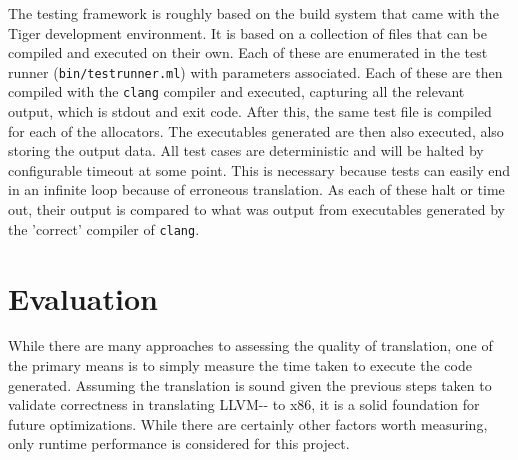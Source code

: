 \documentclass{article}
\begin{document}
The testing framework is roughly based on the build system that came with the Tiger development environment. It is based on a collection of files that can be compiled and executed on their own. Each of these are enumerated in the test runner (\texttt{bin/testrunner.ml}) with parameters associated.   Each of these are then compiled with the \texttt{clang} compiler and executed, capturing all the relevant output, which is stdout and exit code. After this, the same test file is compiled for each of the allocators. The executables generated are then also executed, also storing the output data.   All test cases are deterministic and will be  halted by configurable timeout at some point. This is necessary because tests can easily end in an infinite loop because of erroneous translation. As each of these halt or time out, their output is compared to what was output from executables generated by the 'correct' compiler of \texttt{clang}.










\section{Evaluation}

While there are many approaches to assessing the quality of translation, one of the primary means is to simply measure the time taken to execute the code generated. 
Assuming the translation is sound given the previous steps taken to validate correctness in translating LLVM-{}- to x86, it is a solid foundation for future optimizations. While there are certainly other factors worth measuring, only runtime performance is considered for this project. %

\end{document}
